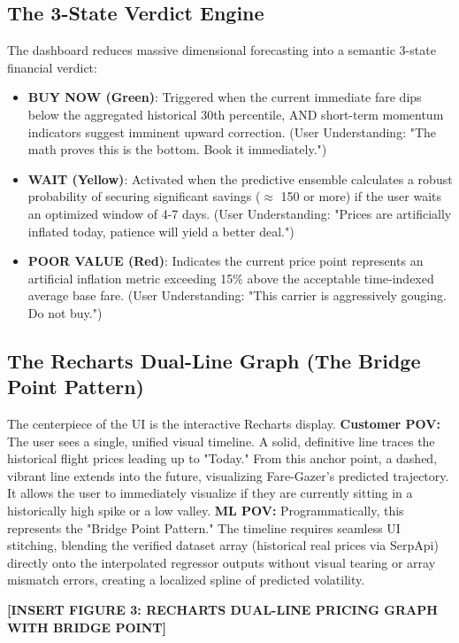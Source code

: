 \documentclass[12pt, a4paper]{article}
\begin{document}
\subsection{The 3-State Verdict Engine}
The dashboard reduces massive dimensional forecasting into a semantic 3-state financial verdict:
\begin{itemize}
    \item \textbf{BUY NOW (Green)}: Triggered when the current immediate fare dips below the aggregated historical 30th percentile, AND short-term momentum indicators suggest imminent upward correction. (User Understanding: "The math proves this is the bottom. Book it immediately.")
    \item \textbf{WAIT (Yellow)}: Activated when the predictive ensemble calculates a robust probability of securing significant savings ($\approx$ 150 or more) if the user waits an optimized window of 4-7 days. (User Understanding: "Prices are artificially inflated today, patience will yield a better deal.")
    \item \textbf{POOR VALUE (Red)}: Indicates the current price point represents an artificial inflation metric exceeding 15\% above the acceptable time-indexed average base fare. (User Understanding: "This carrier is aggressively gouging. Do not buy.")
\end{itemize}

\subsection{The Recharts Dual-Line Graph (The Bridge Point Pattern)}
The centerpiece of the UI is the interactive Recharts display. 
\textbf{Customer POV:} The user sees a single, unified visual timeline. A solid, definitive line traces the historical flight prices leading up to "Today." From this anchor point, a dashed, vibrant line extends into the future, visualizing Fare-Gazer's predicted trajectory. It allows the user to immediately visualize if they are currently sitting in a historically high spike or a low valley.
\textbf{ML POV:} Programmatically, this represents the "Bridge Point Pattern." The timeline requires seamless UI stitching, blending the verified dataset array (historical real prices via SerpApi) directly onto the interpolated regressor outputs without visual tearing or array mismatch errors, creating a localized spline of predicted volatility.

\vspace{0.5in}
\begin{center}
    \textbf{[INSERT FIGURE 3: RECHARTS DUAL-LINE PRICING GRAPH WITH BRIDGE POINT]}
\end{center}
\vspace{0.5in}
\end{document}
